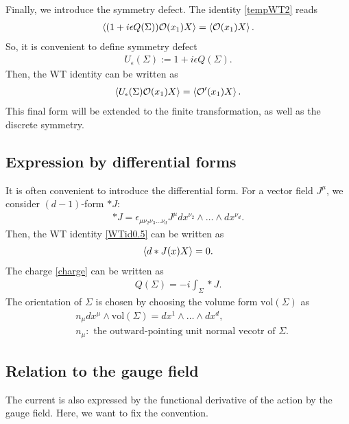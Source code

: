 \documentclass[12pt]{scrartcl}
\newcommand{\Ocal}{\mathcal{O}}
\begin{document}
Finally, we introduce the symmetry defect.  The identity \eqref{tempWT2} reads
\begin{align}
    \expval{(1+i\epsilon Q(\Sigma))\Ocal(x_1)X}=\expval{\Ocal(x_1)X}.
\end{align}
So, it is convenient to define symmetry defect
\begin{align}
    U_{\epsilon}(\Sigma):=
    1+i\epsilon Q(\Sigma).
\end{align}
Then, the WT identity can be written as
\begin{align}
    \expval{U_{\epsilon}(\Sigma)\Ocal(x_1) X}=\expval{\Ocal'(x_1)X}.
\end{align}
This final form will be extended to the finite transformation, as well as the discrete symmetry.
\subsection{Expression by differential forms}

It is often convenient to introduce the differential form.  For a vector field $J^{\mu}$, we consider $(d-1)$-form $*J$:
\begin{align}
    *J=\epsilon_{\mu\nu_2\nu_3\dots \nu_d}J^{\mu}dx^{\nu_2}\wedge \dots \wedge dx^{\nu_d}.
\end{align}
Then, the WT identity \eqref{WTid0.5} can be written as
\begin{align}
    \expval{d*J(x) X}=0.
\end{align}
The charge \eqref{charge} can be written as
\begin{align}
    Q(\Sigma)=-i\int_{\Sigma}*J.
\end{align}
The orientation of $\Sigma$ is chosen by choosing the volume form $\mathrm{vol}(\Sigma)$ as
\begin{align}
    &n_{\mu}dx^{\mu}\wedge \mathrm{vol}(\Sigma)=dx^{1}\wedge \dots \wedge dx^{d},\\
    &n_{\mu}:\text{ the outward-pointing unit normal vecotr of } \Sigma.\nonumber
\end{align}


\subsection{Relation to the gauge field}

The current is also expressed by the functional derivative of the action by the gauge field.  Here, we want to fix the convention.
\end{document}
